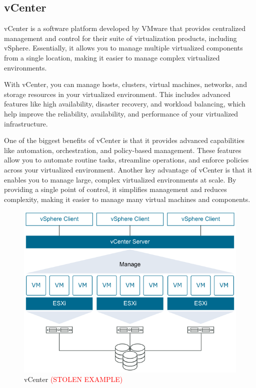 \subsection{vCenter}
vCenter is a software platform developed by VMware that provides centralized management and control for their suite of virtualization products, including vSphere. Essentially, it allows you to manage multiple virtualized components from a single location, making it easier to manage complex virtualized environments.

With vCenter, you can manage hosts, clusters, virtual machines, networks, and storage resources in your virtualized environment. This includes advanced features like high availability, disaster recovery, and workload balancing, which help improve the reliability, availability, and performance of your virtualized infrastructure.

One of the biggest benefits of vCenter is that it provides advanced capabilities like automation, orchestration, and policy-based management. These features allow you to automate routine tasks, streamline operations, and enforce policies across your virtualized environment. Another key advantage of vCenter is that it enables you to manage large, complex virtualized environments at scale. By providing a single point of control, it simplifies management and reduces complexity, making it easier to manage many virtual machines and components.

\begin{figure}[H]
    \centering
    \includegraphics[scale = 0.65]{images/vmware-infrastructure-relationship.png}
    \caption{vCenter \textcolor{red}{(STOLEN EXAMPLE)} }
    \label{vCenter}
\end{figure}

